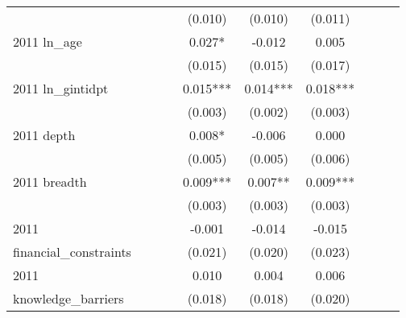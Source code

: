 \begin{table}[htbp]
\begin{tabular}{l*{9}{c}}
                    &               &               &               &     (0.010)   &     (0.010)   &     (0.011)   &               &               &               \\
2011 ln\_age         &               &               &               &       0.027*  &      -0.012   &       0.005   &               &               &               \\
                    &               &               &               &     (0.015)   &     (0.015)   &     (0.017)   &               &               &               \\
2011 ln\_gintidpt    &               &               &               &       0.015***&       0.014***&       0.018***&               &               &               \\
                    &               &               &               &     (0.003)   &     (0.002)   &     (0.003)   &               &               &               \\
2011 depth          &               &               &               &       0.008*  &      -0.006   &       0.000   &               &               &               \\
                    &               &               &               &     (0.005)   &     (0.005)   &     (0.006)   &               &               &               \\
2011 breadth        &               &               &               &       0.009***&       0.007** &       0.009***&               &               &               \\
                    &               &               &               &     (0.003)   &     (0.003)   &     (0.003)   &               &               &               \\
2011                &               &               &               &      -0.001   &      -0.014   &      -0.015   &               &               &               \\
financial\_constraints&               &               &               &     (0.021)   &     (0.020)   &     (0.023)   &               &               &               \\
2011                &               &               &               &       0.010   &       0.004   &       0.006   &               &               &               \\
knowledge\_barriers  &               &               &               &     (0.018)   &     (0.018)   &     (0.020)   &               &               &               \\

\end{tabular}
\end{table}
